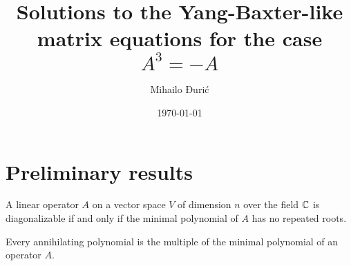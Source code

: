 \documentclass{article}
\title{Solutions to the Yang-Baxter-like matrix equations for the case $A^3 = -A$}
\author{Mihailo Đurić}
\date{\today}
\begin{document}
\maketitle
\tableofcontents
\newpage

\section{Preliminary results}

\begin{theorem} \label{diagonalizable}
  A linear operator $A$ on a vector space $V$ of dimension $n$ over the field $\mathbb{C}$ is diagonalizable if and only if the minimal polynomial of $A$ has no repeated roots.
\end{theorem}

\begin{theorem} \label{minimalpoly}
  Every annihilating polynomial is the multiple of the minimal polynomial of an operator $A$.
\end{theorem}
\end{document}
